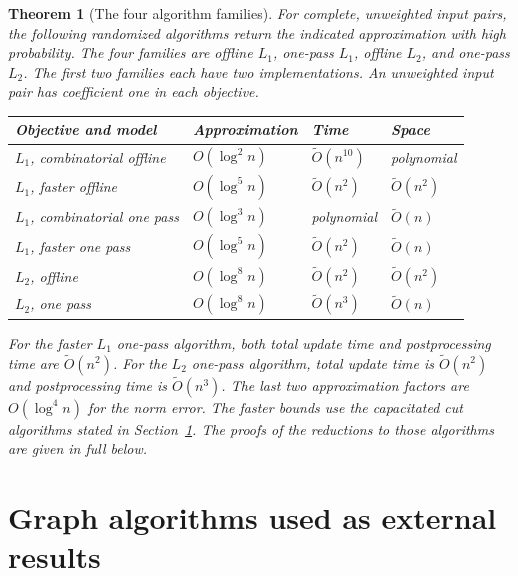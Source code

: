\documentclass[11pt]{article}
\newtheorem{theorem}{Theorem}[section]
\theoremstyle{definition}
\newcommand{\wt}{\widetilde}
\begin{document}
\begin{theorem}[The four algorithm families]\label{thm:four}
For complete, unweighted input pairs, the following randomized algorithms
return the indicated approximation with high probability.
The four families are offline $L_1$, one-pass $L_1$, offline $L_2$, and
one-pass $L_2$. The first two families each have two implementations.
An unweighted input pair has coefficient one in each objective.
\begin{center}
\small
\begin{tabular}{@{}llll@{}}\toprule
Objective and model & Approximation & Time & Space\\\midrule
$L_1$, combinatorial offline & $O(\log^2 n)$ & $\wt O(n^{10})$ & polynomial\\
$L_1$, faster offline & $O(\log^5 n)$ & $\wt O(n^2)$ & $\wt O(n^2)$\\
$L_1$, combinatorial one pass & $O(\log^3 n)$ & polynomial & $\wt O(n)$\\
$L_1$, faster one pass & $O(\log^5 n)$ & $\wt O(n^2)$ & $\wt O(n)$\\
$L_2$, offline & $O(\log^8 n)$ & $\wt O(n^2)$ & $\wt O(n^2)$\\
$L_2$, one pass & $O(\log^8 n)$ & $\wt O(n^3)$ & $\wt O(n)$\\\bottomrule
\end{tabular}
\end{center}
For the faster $L_1$ one-pass algorithm, both total update time and
postprocessing time are $\wt O(n^2)$. For the $L_2$ one-pass algorithm,
total update time is $\wt O(n^2)$ and postprocessing time is $\wt O(n^3)$.
The last two approximation factors are $O(\log^4 n)$ for the norm error.
The faster bounds use the capacitated cut algorithms stated in
Section~\ref{sec:primitives}. The proofs of the reductions to those
algorithms are given in full below.
\end{theorem}

\section{Graph algorithms used as external results}
\label{sec:primitives}
\end{document}
